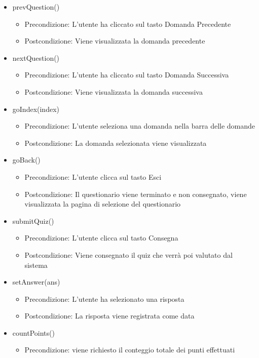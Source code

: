 \begin{itemize}
\begin{itemize}
\begin{itemize}
\end{itemize}
\item prevQuestion()
\begin{itemize}
	\item{Precondizione: L'utente ha cliccato sul tasto Domanda Precedente}
	\item{Postcondizione: Viene visualizzata la domanda precedente}
\end{itemize}
\item nextQuestion()
\begin{itemize}
	\item{Precondizione: L'utente ha cliccato sul tasto Domanda Successiva}
	\item{Postcondizione: Viene visualizzata la domanda successiva}
\end{itemize}
\item goIndex(index)
\begin{itemize}
	\item{Precondizione: L'utente seleziona una domanda nella barra delle domande}
	\item{Postcondizione: La domanda selezionata viene visualizzata}
\end{itemize}
\item goBack()
\begin{itemize}
	\item{Precondizione: L'utente clicca sul tasto Esci}
	\item{Postcondizione: Il questionario viene terminato e non consegnato, viene visualizzata la pagina di selezione del questionario}
\end{itemize}
\item submitQuiz()
\begin{itemize}
	\item{Precondizione: L'utente clicca sul tasto Consegna}
	\item{Postcondizione: Viene consegnato il quiz che verrà poi valutato dal sistema}
\end{itemize}
\item setAnswer(ans)
\begin{itemize}
	\item{Precondizione: L'utente ha selezionato una risposta}
	\item{Postcondizione: La risposta viene registrata come data}
\end{itemize}
\item countPoints()
\begin{itemize}
	\item{Precondizione: viene richiesto il conteggio totale dei punti effettuati}

\end{itemize}
\end{itemize}
\end{itemize}
